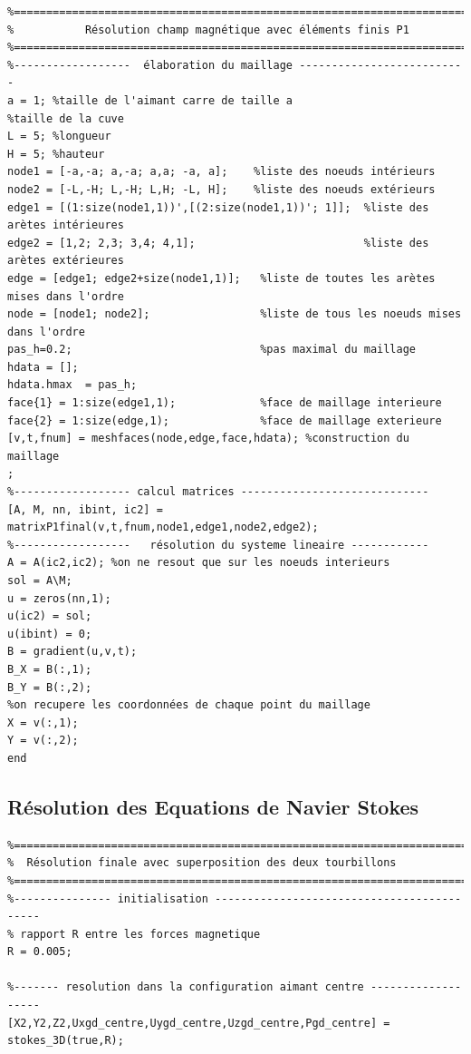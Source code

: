 \documentclass[a4paper,12pt,titlepage]{report}
\begin{document}
\begin{onehalfspace}
\begin{appendix}
\begin{verbatim}
%===========================================================================
%			Résolution champ magnétique avec éléments finis P1
%===========================================================================
%------------------  élaboration du maillage --------------------------
a = 1; %taille de l'aimant carre de taille a
%taille de la cuve
L = 5; %longueur
H = 5; %hauteur
node1 = [-a,-a; a,-a; a,a; -a, a];    %liste des noeuds intérieurs
node2 = [-L,-H; L,-H; L,H; -L, H];    %liste des noeuds extérieurs
edge1 = [(1:size(node1,1))',[(2:size(node1,1))'; 1]];  %liste des arètes intérieures
edge2 = [1,2; 2,3; 3,4; 4,1];                          %liste des arètes extérieures
edge = [edge1; edge2+size(node1,1)];   %liste de toutes les arètes mises dans l'ordre
node = [node1; node2];                 %liste de tous les noeuds mises dans l'ordre
pas_h=0.2;                             %pas maximal du maillage
hdata = [];
hdata.hmax  = pas_h;
face{1} = 1:size(edge1,1);             %face de maillage interieure
face{2} = 1:size(edge,1);              %face de maillage exterieure
[v,t,fnum] = meshfaces(node,edge,face,hdata); %construction du maillage
;
%------------------ calcul matrices -----------------------------
[A, M, nn, ibint, ic2] = matrixP1final(v,t,fnum,node1,edge1,node2,edge2);
%------------------   résolution du systeme lineaire ------------
A = A(ic2,ic2); %on ne resout que sur les noeuds interieurs
sol = A\M;
u = zeros(nn,1);
u(ic2) = sol;
u(ibint) = 0;  
B = gradient(u,v,t);
B_X = B(:,1);
B_Y = B(:,2);
%on recupere les coordonnées de chaque point du maillage
X = v(:,1);
Y = v(:,2);
end
\end{verbatim}


\subsection{Résolution des Equations de Navier Stokes}
\begin{verbatim}
%=========================================================================% 
%  Résolution finale avec superposition des deux tourbillons
%=========================================================================%
%--------------- initialisation -------------------------------------------
% rapport R entre les forces magnetique
R = 0.005;

%------- resolution dans la configuration aimant centre -------------------
[X2,Y2,Z2,Uxgd_centre,Uygd_centre,Uzgd_centre,Pgd_centre] = stokes_3D(true,R);



\end{verbatim}
\end{appendix}
\end{onehalfspace}
\end{document}
